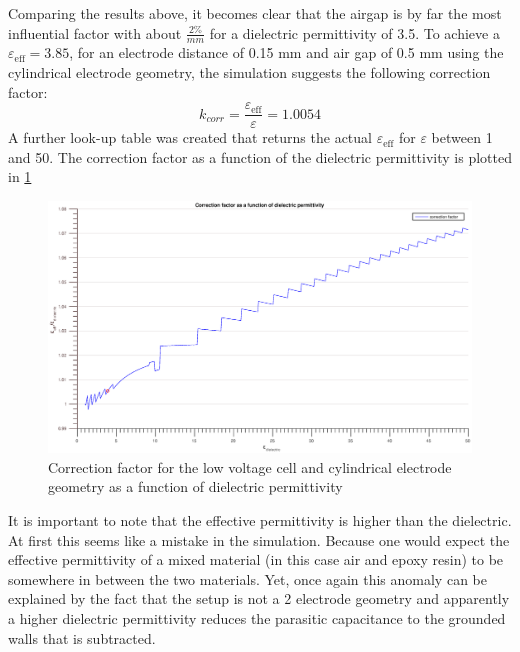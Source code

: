 Comparing the results above, it becomes clear that the airgap is by
far the most influential factor with about $\frac{2\%}{mm}$ for a dielectric permittivity of 3.5.
To achieve a $\varepsilon_{\textrm{eff}}=3.85$, for an electrode distance of 0.15 mm and air gap of 0.5 mm using the
cylindrical electrode geometry, the simulation
suggests the following correction factor:
\begin{equation}
 k_{corr}=\frac{\varepsilon_{\textrm{eff}}}{\varepsilon}=1.0054
\end{equation}
A further look-up table was created that returns the actual $\varepsilon_{\textrm{eff}}$ for $\varepsilon$ between 1 and 50.
The correction factor as a function of the dielectric permittivity is plotted in \ref{fig.correctionfactor}

\begin{figure}[htbp]
	\centering
	\centerline{\includegraphics[width=\textwidth]{figures/Results/Correction/correction.eps}}		
	\caption[Kurze Abbildungsbeschreibung]{Correction factor for the low voltage cell and cylindrical electrode geometry as a function of dielectric permittivity } 
	\label{fig.correctionfactor}
\end{figure}


It is important to note that the effective permittivity is higher than the dielectric. At first this seems
like a mistake in the simulation. Because one would expect the effective permittivity of a 
mixed material (in this case air and epoxy resin) to be somewhere in between the two materials.
Yet, once again this anomaly can be explained by
the fact that the setup is not a 2 electrode geometry and apparently a higher dielectric permittivity
reduces the parasitic capacitance to the grounded walls that is subtracted.



